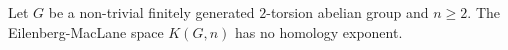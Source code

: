 Let $G$ be a non-trivial finitely generated $2$-torsion abelian group and $n\geq2$. The Eilenberg-MacLane space $K(G,n)$ has no homology exponent.